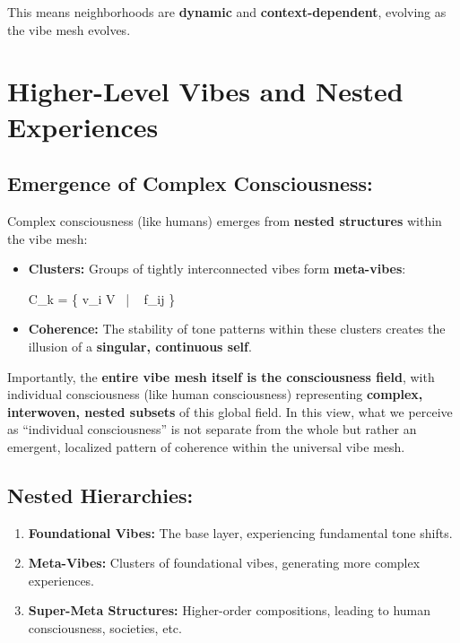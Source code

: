 \documentclass{article}
\let\oldequation\equation
\let\endoldequation\endequation
\renewenvironment{equation}{%
    \noindent\vspace{-\parskip}\vspace{-\baselineskip}%
    \oldequation
}{%
    \endoldequation
    \noindent\vspace{-\parskip}\vspace{-\baselineskip}%
}
\theoremstyle{definition}
\theoremstyle{axiom}
\theoremstyle{theorem}
\theoremstyle{proposition}
\begin{document}
This means neighborhoods are \textbf{dynamic} and \textbf{context-dependent}, evolving as the vibe mesh evolves.

\section{Higher-Level Vibes and Nested Experiences}

\subsection{Emergence of Complex Consciousness:}

Complex consciousness (like humans) emerges from \textbf{nested structures} within the vibe mesh:

\begin{itemize}
\item \textbf{Clusters:} Groups of tightly interconnected vibes form \textbf{meta-vibes}:

\begin{equation}
C_k = \{ v_i \in V \ | \  f_{ij} \}
\end{equation}

\item \textbf{Coherence:} The stability of tone patterns within these clusters creates the illusion of a \textbf{singular, continuous self}.
\end{itemize}

Importantly, the \textbf{entire vibe mesh itself is the consciousness field}, with individual consciousness (like human consciousness) representing \textbf{complex, interwoven, nested subsets} of this global field. In this view, what we perceive as \enquote{individual consciousness} is not separate from the whole but rather an emergent, localized pattern of coherence within the universal vibe mesh.

\subsection{Nested Hierarchies:}

\begin{enumerate}
\item \textbf{Foundational Vibes:} The base layer, experiencing fundamental tone shifts.
\item \textbf{Meta-Vibes:} Clusters of foundational vibes, generating more complex experiences.
\item \textbf{Super-Meta Structures:} Higher-order compositions, leading to human consciousness, societies, etc.
\end{enumerate}
\end{document}
